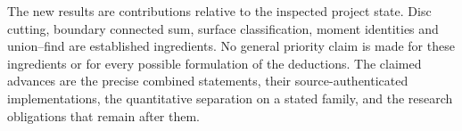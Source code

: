 The new results are contributions relative to the inspected project state.
Disc cutting, boundary connected sum, surface classification, moment
identities and union--find are established ingredients.  No general priority
claim is made for these ingredients or for every possible formulation of
the deductions.  The claimed advances are the precise combined statements,
their source-authenticated implementations, the quantitative separation on
a stated family, and the research obligations that remain after them.
